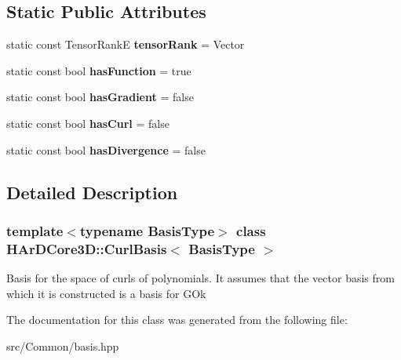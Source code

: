 \subsection*{Static Public Attributes}
\begin{DoxyCompactItemize}
\item 
\mbox{\label{classHArDCore3D_1_1CurlBasis_a27d5f76ff419fbc0e1ce3200bf60d5af}} 
static const Tensor\+RankE {\bfseries tensor\+Rank} = Vector
\item 
\mbox{\label{classHArDCore3D_1_1CurlBasis_aa3dddcba9bc2d51963ad399f3187037f}} 
static const bool {\bfseries has\+Function} = true
\item 
\mbox{\label{classHArDCore3D_1_1CurlBasis_a4083d38b937f063c7ef81c25ad74dbb3}} 
static const bool {\bfseries has\+Gradient} = false
\item 
\mbox{\label{classHArDCore3D_1_1CurlBasis_abc35e5e4f2cdab3ad77de9f2ba1d32ac}} 
static const bool {\bfseries has\+Curl} = false
\item 
\mbox{\label{classHArDCore3D_1_1CurlBasis_a5a3ced55d938a4db0cb91c78b076d5e7}} 
static const bool {\bfseries has\+Divergence} = false
\end{DoxyCompactItemize}


\subsection{Detailed Description}
\subsubsection*{template$<$typename Basis\+Type$>$\newline
class H\+Ar\+D\+Core3\+D\+::\+Curl\+Basis$<$ Basis\+Type $>$}

Basis for the space of curls of polynomials. It assumes that the vector basis from which it is constructed is a basis for G\+Ok 

The documentation for this class was generated from the following file\+:\begin{DoxyCompactItemize}
\item 
src/\+Common/basis.\+hpp\end{DoxyCompactItemize}
